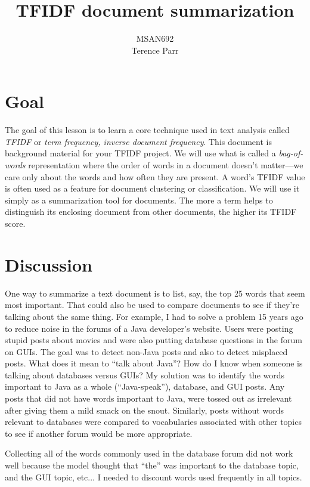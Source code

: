 \documentclass[10pt]{article}
\title{TFIDF document summarization}
\author{MSAN692\\Terence Parr}
\date{} %
\begin{document}
\maketitle

\setlength{\algomargin}{3pt}

\section{Goal}

The goal of this lesson is to learn a core technique used in text analysis called {\em TFIDF} or {\em term frequency, inverse document frequency}. This document is background material for your TFIDF project. We will use what is called a {\em bag-of-words} representation where the order of words in a document doesn't matter---we care only about the words and how often they are present. A word's TFIDF value is often used as a feature for document clustering or classification. We will use it simply as a summarization tool for documents. The more a term helps to distinguish its enclosing document from other documents, the higher its TFIDF score. 

\section{Discussion}

One way to summarize a text document is to list, say, the top 25 words that seem most important. That could also be used to compare documents to see if they're talking about the same thing. For example, I had to solve a problem 15 years ago to reduce noise in the forums of a Java developer's website.  Users were posting stupid posts about movies and were also putting database questions in the forum on GUIs. The goal was to detect non-Java posts and also to detect misplaced posts. What does it mean to ``talk about Java''?  How do I know when someone is talking about databases versus GUIs? My solution was to identify the words important to Java as a whole (``Java-speak''), database, and GUI posts.  Any posts that did not have words important to Java, were tossed out as irrelevant after giving them a mild smack on the snout. Similarly, posts without words relevant to databases were compared to vocabularies associated with other topics to see if another forum would be more appropriate.  

Collecting all of the words commonly used in the database forum did not work well because the model  thought that ``the'' was important to the database topic, and the GUI topic, etc... I needed to discount words used frequently in all topics.
\end{document}
